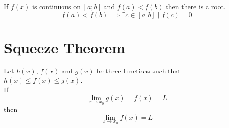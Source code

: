 \documentclass{article}
\begin{document}
If \(f(x)\) is continuous on \([a;b]\) and \(f(a)<f(b)\) then there is a root.
\[
    f(a)<f(b) \implies \exists c \in [a;b] \mid f(c) = 0
\]

\section{Squeeze Theorem}

Let \(h(x)\), \(f(x)\) and \(g(x)\) be three functions such that
\(h(x) \leq f(x) \leq g(x)\). \\
If
\[
    \lim_{x \to x_0} g(x) = f(x) = L
\]
then
\[
    \lim_{x \to x_0} f(x) = L
\]


\end{document}
